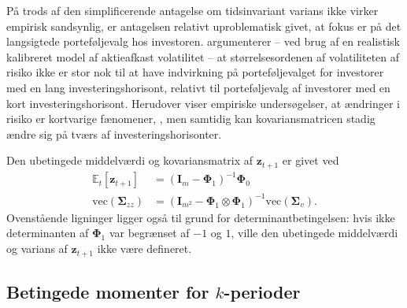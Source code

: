 \documentclass[
  a4paper,
  oneside]{memoir}
\begin{document}
\vspace{5mm}

På trods af den simplificerende antagelse om tidsinvariant varians ikke virker empirisk sandsynlig, er antagelsen relativt uproblematisk givet, at fokus er på det langsigtede porteføljevalg hos investoren. \citep{Chacko2005} argumenterer -- ved brug af en realistisk kalibreret model af aktieafkast volatilitet -- at størrelsesordenen af volatiliteten af risiko ikke er stor nok til at have indvirkning på porteføljevalget for investorer med en lang investeringshorisont, relativt til porteføljevalg af investorer med en kort investeringshorisont. Herudover viser empiriske undersøgelser, at ændringer i risiko er kortvarige fænomener, \citep{Camp1987}, men samtidig kan kovariansmatricen stadig ændre sig på tværs af investeringshorisonter.

\vspace{5mm}

Den ubetingede middelværdi og kovariansmatrix af \(\bm{z}_{t+1}\) er givet ved
\begin{align*}
        \mathbb{E}_t\left[\bm{z}_{t+1}\right] &= (\bm{I}_m-\bm{\Phi}_1)^{-1}\bm{\Phi}_0\\
        \text{vec}(\bm{\Sigma}_{zz}) &= (\bm{I}_{m^2}-\bm{\Phi}_1\otimes\bm{\Phi}_1)^{-1}\text{vec}(\bm{\Sigma}_v).
    \end{align*}
Ovenstående ligninger ligger også til grund for determinantbetingelsen: hvis ikke determinanten af \(\bm{\Phi}_1\) var begrænset af \(-1\) og \(1\), ville den ubetingede middelværdi og varians af \(\bm{z}_{t+1}\) ikke være defineret.

\subsection{Betingede momenter for $k$-perioder}
\end{document}
